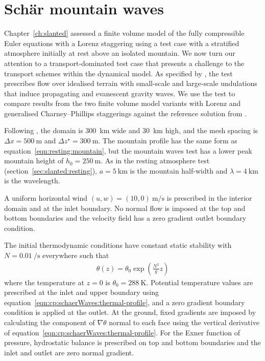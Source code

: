 \section{Sch\"{a}r mountain waves}
\label{sec:cp:schaerWaves}

Chapter~\ref{ch:slanted} assessed a finite volume model of the fully compressible Euler equations with a Lorenz staggering using a test case with a stratified atmosphere initially at rest above an isolated mountain.
We now turn our attention to a transport-dominated test case that presents a challenge to the transport schemes within the dynamical model.
As specified by \citet{schaer2002}, the test prescribes flow over idealised terrain with small-scale and large-scale undulations that induce propagating and evanescent gravity waves.
We use the test to compare results from the two finite volume model variants with Lorenz and generalised Charney--Phillips staggerings against the reference solution from \citet{melvin2010}.

Following \citet{melvin2010}, the domain is \SI{300}{\kilo\meter} wide and \SI{30}{\kilo\meter} high, and the mesh spacing is $\Delta x = \SI{500}{\meter}$ and $\Delta z^\star = \SI{300}{\meter}$.
The mountain profile has the same form as equation~\eqref{eqn:resting:mountain}, but the mountain waves test has a lower peak mountain height of $h_0 = \SI{250}{\meter}$.  As in the resting atmosphere test (section~\ref{sec:slanted:resting}), $a = \SI{5}{\kilo\meter}$ is the mountain half-width and $\lambda = \SI{4}{\kilo\meter}$ is the wavelength.

A uniform horizontal wind $(u, w) = (10, 0)\:\si{\meter\per\second}$ is prescribed in the interior domain and at the inlet boundary.  No normal flow is imposed at the top and bottom boundaries and the velocity field has a zero gradient outlet boundary condition.

The initial thermodynamic conditions have constant static stability with $N = \SI{0.01}{\per\second}$ everywhere such that
\begin{align}
	\theta(z) = \theta_0 \exp \left( \frac{N^2}{g} z \right) \label{eqn:cp:schaerWaves:thermal-profile}
\end{align}
where the temperature at $z=0$ is $\theta_0 = \SI{288}{\kelvin}$.
Potential temperature values are prescribed at the inlet and upper boundary using equation~\eqref{eqn:cp:schaerWaves:thermal-profile}, and a zero gradient boundary condition is applied at the outlet.
At the ground, fixed gradients are imposed by calculating the component of $\nabla \theta$ normal to each face using the vertical derivative of equation~\eqref{eqn:cp:schaerWaves:thermal-profile}.
For the Exner function of pressure, hydrostatic balance is prescribed on top and bottom boundaries and the inlet and outlet are zero normal gradient.

